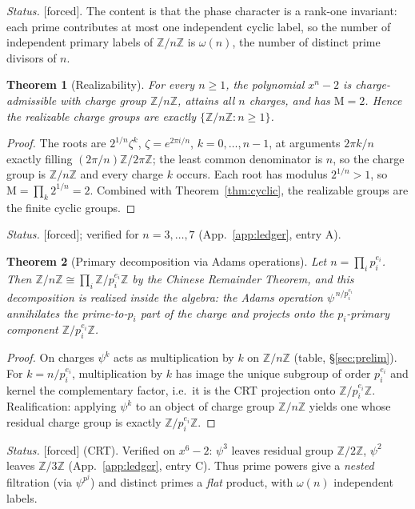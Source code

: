 \documentclass[11pt]{article}
\newtheorem{theorem}{Theorem}[section]
\theoremstyle{definition}
\theoremstyle{remark}
\newcommand{\Mah}{\mathrm{M}}
\newcommand{\Z}{\mathbb{Z}}
\newcommand{\Adams}[1]{\psi^{#1}}
\newcommand{\Zmod}[1]{\Z/#1\Z}
\newcommand{\status}[1]{{\small\textsf{[#1]}}}
\newcommand{\forced}{\status{forced}}
\begin{document}
\noindent\emph{Status.} \forced{}. The content is that the phase character is a rank-one
invariant: each prime contributes at most one independent cyclic label, so the number of
independent primary labels of $\Zmod n$ is $\omega(n)$, the number of distinct prime
divisors of $n$.

\begin{theorem}[Realizability]\label{thm:realize}
For every $n\ge1$, the polynomial $x^{n}-2$ is charge-admissible with charge group $\Zmod n$,
attains all $n$ charges, and has $\Mah=2$. Hence the realizable charge groups are exactly
$\{\Zmod n: n\ge1\}$.
\end{theorem}
\begin{proof}
The roots are $2^{1/n}\zeta^{k}$, $\zeta=e^{2\pi i/n}$, $k=0,\dots,n-1$, at arguments
$2\pi k/n$ exactly filling $(2\pi/n)\Z/2\pi\Z$; the least common denominator is $n$, so the
charge group is $\Zmod n$ and every charge $k$ occurs. Each root has modulus $2^{1/n}>1$, so
$\Mah=\prod_k 2^{1/n}=2$. Combined with Theorem~\ref{thm:cyclic}, the realizable groups are
the finite cyclic groups.
\end{proof}
\emph{Status.} \forced{}; verified for $n=3,\dots,7$ (App.~\ref{app:ledger}, entry A).

\begin{theorem}[Primary decomposition via Adams operations]\label{thm:crt}
Let $n=\prod_{i} p_i^{e_i}$. Then $\Zmod n\cong\prod_i\Zmod{p_i^{e_i}}$ by the Chinese
Remainder Theorem, and this decomposition is realized inside the algebra: the Adams operation
$\Adams{\,n/p_i^{e_i}}$ annihilates the prime-to-$p_i$ part of the charge and projects onto
the $p_i$-primary component $\Zmod{p_i^{e_i}}$.
\end{theorem}
\begin{proof}
On charges $\Adams k$ acts as multiplication by $k$ on $\Zmod n$
(table, \S\ref{sec:prelim}). For $k=n/p_i^{e_i}$, multiplication by $k$ has image the unique
subgroup of order $p_i^{e_i}$ and kernel the complementary factor, i.e.\ it is the CRT
projection onto $\Zmod{p_i^{e_i}}$. Realification: applying $\Adams{k}$ to an object of charge
group $\Zmod n$ yields one whose residual charge group is exactly $\Zmod{p_i^{e_i}}$.
\end{proof}
\emph{Status.} \forced{} (CRT). Verified on $x^6-2$: $\Adams3$ leaves residual group
$\Zmod2$, $\Adams2$ leaves $\Zmod3$ (App.~\ref{app:ledger}, entry C). Thus prime powers give a
\emph{nested} filtration (via $\Adams{p^{j}}$) and distinct primes a \emph{flat} product,
with $\omega(n)$ independent labels.
\end{document}
